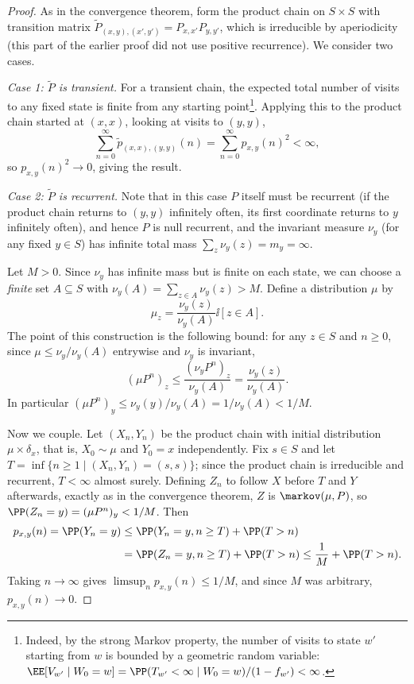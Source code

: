 \documentclass[a4paper]{scrartcl}
\begin{document}
\begin{proof}
	As in the convergence theorem, form the product chain on $S \times S$ with transition matrix $\widetilde{P}_{(x, y), (x', y')} = P_{x, x'}P_{y, y'}$, which is irreducible by aperiodicity (this part of the earlier proof did not use positive recurrence). We consider two cases.

	\emph{Case 1: $\widetilde{P}$ is transient.} For a transient chain, the expected total number of visits to any fixed state is finite from any starting point\footnote{Indeed, by the strong Markov property, the number of visits to state $w'$ starting from $w$ is bounded by a geometric random variable: $\EE[V_{w'} \mid W_0 = w] = \PP(T_{w'} < \infty \mid W_0 = w)/(1 - f_{w'}) < \infty$.}. Applying this to the product chain started at $(x, x)$, looking at visits to $(y, y)$,
	$$
	\sum_{n = 0}^{\infty} \widetilde{p}_{(x,x), (y,y)}(n) = \sum_{n = 0}^{\infty} p_{x, y}(n)^2 < \infty,
	$$
	so $p_{x, y}(n)^2 \rightarrow 0$, giving the result.

	\emph{Case 2: $\widetilde{P}$ is recurrent.} Note that in this case $P$ itself must be recurrent (if the product chain returns to $(y, y)$ infinitely often, its first coordinate returns to $y$ infinitely often), and hence $P$ is null recurrent, and the invariant measure $\nu_y$ (for any fixed $y \in S$) has infinite total mass $\sum_z \nu_y(z) = m_y = \infty$.

	Let $M > 0$. Since $\nu_y$ has infinite mass but is finite on each state, we can choose a \emph{finite} set $A \subseteq S$ with $\nu_y(A) = \sum_{z \in A}\nu_y(z) > M$. Define a distribution $\mu$ by
	$$
	\mu_z = \frac{\nu_y(z)}{\nu_y(A)} \ii[z \in A].
	$$
	The point of this construction is the following bound: for any $z \in S$ and $n \geq 0$, since $\mu \leq \nu_y / \nu_y(A)$ entrywise and $\nu_y$ is invariant,
	$$
	(\mu P^n)_z \leq \frac{(\nu_y P^n)_z}{\nu_y(A)} = \frac{\nu_y(z)}{\nu_y(A)}.
	$$
	In particular $(\mu P^n)_y \leq \nu_y(y)/\nu_y(A) = 1/\nu_y(A) < 1/M$.

	Now we couple. Let $(X_n, Y_n)$ be the product chain with initial distribution $\mu \times \delta_x$, that is, $X_0 \sim \mu$ and $Y_0 = x$ independently. Fix $s \in S$ and let $T = \inf\{n \geq 1 \mid (X_n, Y_n) = (s, s)\}$; since the product chain is irreducible and recurrent, $T < \infty$ almost surely. Defining $Z_n$ to follow $X$ before $T$ and $Y$ afterwards, exactly as in the convergence theorem, $Z$ is $\markov(\mu, P)$, so $\PP(Z_n = y) = (\mu P^n)_y < 1/M$. Then
	\begin{align*}
	p_{x, y}(n) = \PP(Y_n = y) &\leq \PP(Y_n = y, n \geq T) + \PP(T > n) \\
	&= \PP(Z_n = y, n \geq T) + \PP(T > n) \leq \frac{1}{M} + \PP(T > n).
	\end{align*}
	Taking $n \to \infty$ gives $\limsup_n p_{x, y}(n) \leq 1/M$, and since $M$ was arbitrary, $p_{x, y}(n) \rightarrow 0$.
\end{proof}
\end{document}
